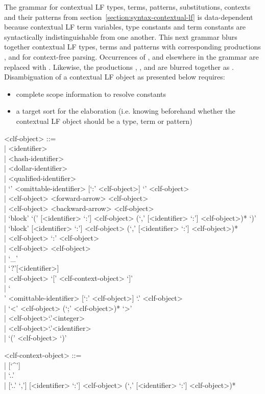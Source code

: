 \documentclass[11pt]{article}
\newcommand{\LF}{\textsc{LF}\xspace}
\begin{document}
The grammar for contextual \LF types, terms, patterns, substitutions, contexts and their patterns from section~\ref{section:syntax-contextual-lf} is data-dependent because contextual \LF term variables, type constants and term constants are syntactically indistinguishable from one another.
This next grammar blurs together contextual \LF types, terms and patterns with corresponding productions ,  and  for context-free parsing.
Occurrences of ,  and  elsewhere in the grammar are replaced with .
Likewise, the productions , ,  and  are blurred together as .
Disambiguation of a contextual \LF object as presented below requires:
\begin{itemize}
\item complete scope information to resolve constants
\item a target sort for the elaboration (i.e. knowing beforehand whether the contextual \LF object should be a type, term or pattern)
\end{itemize}

\begin{grammar}
<clf-object> ::= \hfill\\
| <identifier>\\
| <hash-identifier>\\
| <dollar-identifier>\\
| <qualified-identifier>\\
| `{' <omittable-identifier> [`:' <clf-object>] `}' <clf-object>\\
| <clf-object> <forward-arrow> <clf-object>\\
| <clf-object> <backward-arrow> <clf-object>\\
| `block' `(' [<identifier> `:'] <clf-object> (`,' [<identifier> `:'] <clf-object>)* `)'\\
| `block' [<identifier> `:'] <clf-object> (`,' [<identifier> `:'] <clf-object>)*\\
| <clf-object> `:' <clf-object>\\
| <clf-object> <clf-object>\\
| `_'\\
| `?'[<identifier>]\\
| <clf-object> `[' <clf-context-object> `]'\\
| `\\' <omittable-identifier> [`:' <clf-object>] `.' <clf-object>\\
| `<' <clf-object> (`;' <clf-object>)* `>'\\
| <clf-object>`.'<integer>\\
| <clf-object>`.'<identifier>\\
| `(' <clf-object> `)'

<clf-context-object> ::= \hfill\\
| [`^']\\
| `..'\\
| [`..' `,'] [<identifier> `:'] <clf-object> (`,' [<identifier> `:'] <clf-object>)*
\end{grammar}
\end{document}
